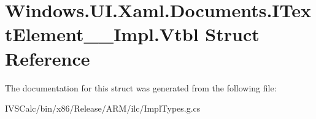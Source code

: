 \hypertarget{struct_windows_1_1_u_i_1_1_xaml_1_1_documents_1_1_i_text_element_____impl_1_1_vtbl}{}\section{Windows.\+U\+I.\+Xaml.\+Documents.\+I\+Text\+Element\+\_\+\+\_\+\+Impl.\+Vtbl Struct Reference}
\label{struct_windows_1_1_u_i_1_1_xaml_1_1_documents_1_1_i_text_element_____impl_1_1_vtbl}


The documentation for this struct was generated from the following file\+:\begin{DoxyCompactItemize}
\item 
I\+V\+S\+Calc/bin/x86/\+Release/\+A\+R\+M/ilc/Impl\+Types.\+g.\+cs\end{DoxyCompactItemize}
